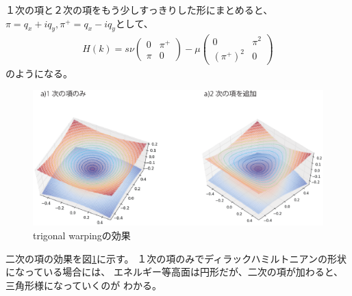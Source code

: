 \documentclass{article}
\begin{document}
１次の項と２次の項をもう少しすっきりした形にまとめると、
$\pi=q_x+iq_y, \pi^+=q_x-iq_y$として、
\begin{eqnarray}
H(k)=s\nu  \left( 
 \begin{array}{cc}
	0 &  \pi^+ \\
	\pi & 0
 \end{array}
\right) -\mu \left( 
 \begin{array}{cc}
	0 &  \pi^2 \\
	(\pi^{+})^2 & 0
 \end{array}
\right)
\end{eqnarray}
のようになる。

\begin{figure}[htbp]
\begin{center}
\includegraphics[width=15cm]{trigonalWarping.eps}
\end{center}
\label{trigonal}
\caption{trigonal warpingの効果}
\end{figure}

二次の項の効果を図\ref{trigonal}に示す。
１次の項のみでディラックハミルトニアンの形状になっている場合には、
エネルギー等高面は円形だが、二次の項が加わると、三角形様になっていくのが
わかる。
\end{document}
